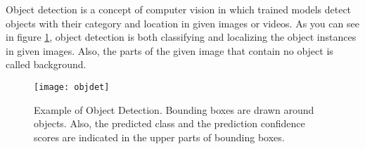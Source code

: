 \documentclass{article}
\begin{document}
\setlength{\parindent}{6ex}

\indent

Object detection is a concept of computer vision in which trained models 
detect objects with their category and location in given images or videos. 
As you can see in figure \ref{fig:objdet1}, object detection is both 
classifying and localizing the object instances in given images. Also, the 
parts of the given image that contain no object is called background.

\begin{figure}
    \centering
    \texttt{[image: objdet]}
    \caption{Example of Object Detection. Bounding boxes are drawn around 
    objects. Also, the predicted class and the prediction confidence scores are 
    indicated in the upper parts of bounding boxes.}
    \label{fig:objdet1}
\end{figure}
\end{document}
